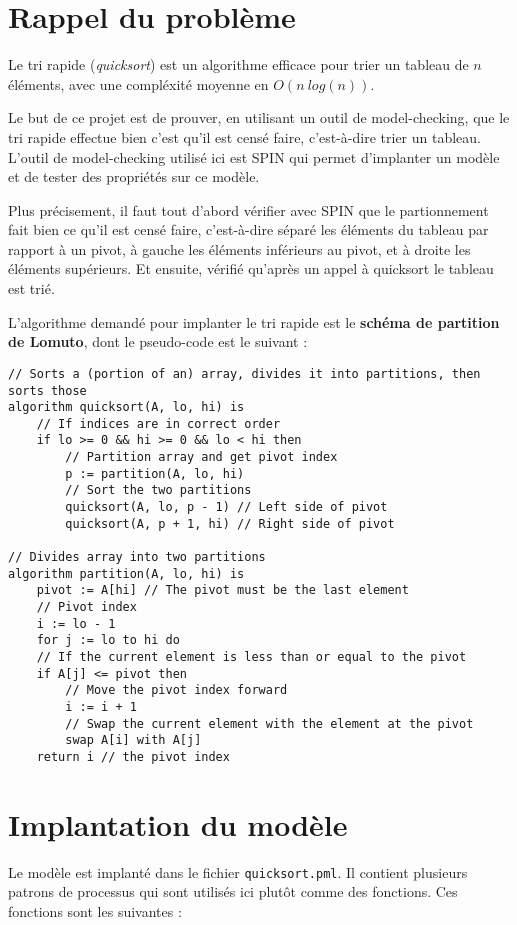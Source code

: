 \documentclass[french]{article}
\begin{document}

\tableofcontents
\newpage

\section{Rappel du problème}
Le tri rapide (\emph{quicksort}) est un algorithme efficace pour trier un tableau de $n$ éléments, avec une compléxité
moyenne en $O(n\ log(n))$.

Le but de ce projet est de prouver, en utilisant un outil de model-checking, que le tri rapide
effectue bien c'est qu'il est censé faire, c'est-à-dire trier un tableau. L'outil de model-checking utilisé ici est SPIN qui permet d'implanter un modèle et de tester des propriétés sur ce modèle.

Plus précisement, il faut tout d'abord vérifier avec SPIN que le
partionnement fait bien ce qu'il est censé faire, c'est-à-dire séparé les éléments du tableau par
rapport à un pivot, à gauche les éléments inférieurs au pivot, et à droite les éléments supérieurs.
Et ensuite, vérifié qu'après un appel à quicksort le tableau est trié.\newline

L'algorithme demandé pour implanter le tri rapide est le \textbf{schéma de partition de Lomuto},
dont le pseudo-code est le suivant :
\begin{verbatim}
// Sorts a (portion of an) array, divides it into partitions, then sorts those
algorithm quicksort(A, lo, hi) is
    // If indices are in correct order
    if lo >= 0 && hi >= 0 && lo < hi then
        // Partition array and get pivot index
        p := partition(A, lo, hi)
        // Sort the two partitions
        quicksort(A, lo, p - 1) // Left side of pivot
        quicksort(A, p + 1, hi) // Right side of pivot

// Divides array into two partitions
algorithm partition(A, lo, hi) is
    pivot := A[hi] // The pivot must be the last element
    // Pivot index
    i := lo - 1
    for j := lo to hi do
    // If the current element is less than or equal to the pivot
    if A[j] <= pivot then
        // Move the pivot index forward
        i := i + 1
        // Swap the current element with the element at the pivot
        swap A[i] with A[j]
    return i // the pivot index
\end{verbatim}
\newpage

\section{Implantation du modèle}
Le modèle est implanté dans le fichier \verb:quicksort.pml:. Il contient plusieurs patrons de
processus qui sont utilisés ici plutôt comme des fonctions. Ces fonctions sont les suivantes :
\end{document}
